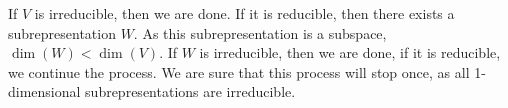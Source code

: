 
If $V$ is irreducible, then we are done. If it is reducible, then there exists a subrepresentation $W$. As this subrepresentation is a subspace, $\dim(W) < \dim (V)$. If $W$ is irreducible, then we are done, if it is reducible, we continue the process. We are sure that this process will stop once, as all 1-dimensional subrepresentations are irreducible.

